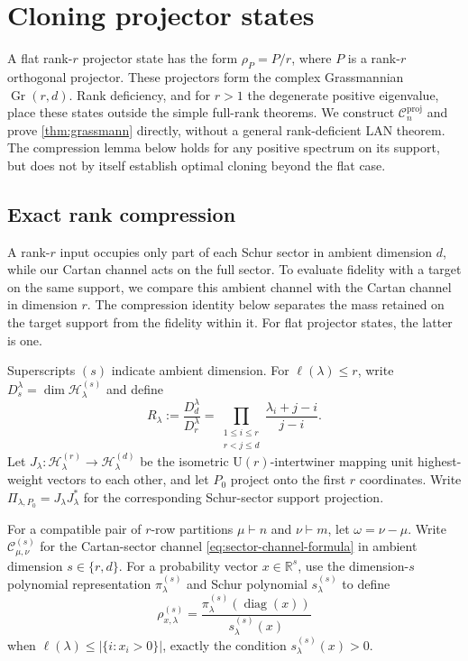 \documentclass[11pt]{article}
\theoremstyle{remark}
\theoremstyle{plain}
\newcommand{\R}{\mathbb R}
\newcommand{\cC}{\mathcal C}
\newcommand{\cH}{\mathcal H}
\newcommand{\U}{\mathrm U}
\newcommand{\diag}{\operatorname{diag}}
\newcommand{\Gr}{\operatorname{Gr}}
\begin{document}
\section{Cloning projector states}
\label{sec:grassmann}

A flat rank-\(r\) projector state has the form
\(\rho_P=P/r\), where \(P\) is a rank-\(r\) orthogonal projector.  These
projectors form the complex Grassmannian \(\Gr(r,d)\).  Rank deficiency,
and for \(r>1\) the degenerate positive eigenvalue, place these states
outside the simple full-rank theorems.
We construct \(\cC_n^{\mathrm{proj}}\) and prove
\cref{thm:grassmann} directly, without a general rank-deficient LAN theorem.
The compression lemma below holds for any positive spectrum on its
support, but does not by itself establish optimal cloning beyond the flat
case.

\subsection{Exact rank compression}
\label{sec:compression}

A rank-\(r\) input occupies only part of each Schur sector in ambient
dimension \(d\), while our Cartan channel acts on the full sector.  To evaluate
fidelity with a target on the same support, we compare this ambient
channel with the Cartan channel in dimension \(r\).  The compression
identity below separates the mass retained on the target support from
the fidelity within it. For flat projector states, the latter is one.

Superscripts \((s)\) indicate ambient dimension.  For
\(\ell(\lambda)\le r\), write \(D_s^\lambda=\dim\cH_\lambda^{(s)}\) and
define
\begin{equation}
  R_\lambda:=\frac{D_d^\lambda}{D_r^\lambda}
  =\prod_{\substack{1\le i\le r\\r<j\le d}}
    \frac{\lambda_i+j-i}{j-i}.
  \label{eq:R-lambda}
\end{equation}
Let \(J_\lambda:\cH_\lambda^{(r)}\to\cH_\lambda^{(d)}\) be the isometric
\(\U(r)\)-intertwiner mapping unit highest-weight vectors to each other,
and let \(P_0\) project onto the first \(r\) coordinates.  Write
\(\Pi_{\lambda,P_0}=J_\lambda J_\lambda^*\) for the corresponding
Schur-sector support projection.

For a compatible pair of \(r\)-row partitions \(\mu\vdash n\) and
\(\nu\vdash m\), let \(\omega=\nu-\mu\).  Write
\(\cC_{\mu,\nu}^{(s)}\) for the Cartan-sector channel
\eqref{eq:sector-channel-formula} in ambient dimension \(s\in\{r,d\}\).
For a probability vector \(x\in\R^s\), use the dimension-\(s\)
polynomial representation \(\pi_\lambda^{(s)}\) and Schur polynomial
\(s_\lambda^{(s)}\) to define
\[
  \rho_{x,\lambda}^{(s)}
  =\frac{\pi_\lambda^{(s)}(\diag(x))}{s_\lambda^{(s)}(x)}
\]
when \(\ell(\lambda)\le|\{i:x_i>0\}|\), exactly the condition
\(s_\lambda^{(s)}(x)>0\).
\end{document}
